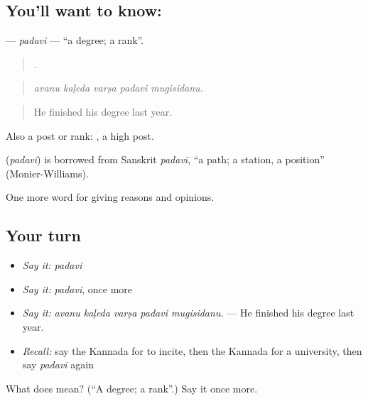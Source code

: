 \subsection*{You'll want to know: }
\textbf{} — \emph{padavi} — \textquotedblleft{}a degree; a rank\textquotedblright{}.

\begin{quote}
    .
\end{quote}

\begin{quote}
\emph{avanu kaḷeda varṣa padavi mugisidanu.}
\end{quote}

\begin{quote}
He finished his degree last year.
\end{quote}

Also a post or rank:  , a high post.

\begin{cousinweb}
\textbf{} (\emph{padavi}) is borrowed from Sanskrit \emph{padavī}, \textquotedblleft{}a path; a station, a position\textquotedblright{} (Monier-Williams).
\end{cousinweb}

\begin{grammarlens}[title={What you've built}]
One more word for giving reasons and opinions.
\end{grammarlens}

\subsection*{Your turn}
\begin{itemize}
\raggedright
  \item \emph{Say it:} \emph{padavi}
  \item \emph{Say it:} \emph{padavi}, once more
  \item \emph{Say it:} \emph{avanu kaḷeda varṣa padavi mugisidanu.} — He finished his degree last year.
  \item \emph{Recall:} say the Kannada for to incite, then the Kannada for a university, then say \emph{padavi} again
\end{itemize}

\begin{tcolorbox}[breakable,colback=teal!4,colframe=teal!35!black,title={Before you move on}]
What does  mean? (\textquotedblleft{}A degree; a rank\textquotedblright{}.) Say it once more.
\end{tcolorbox}

